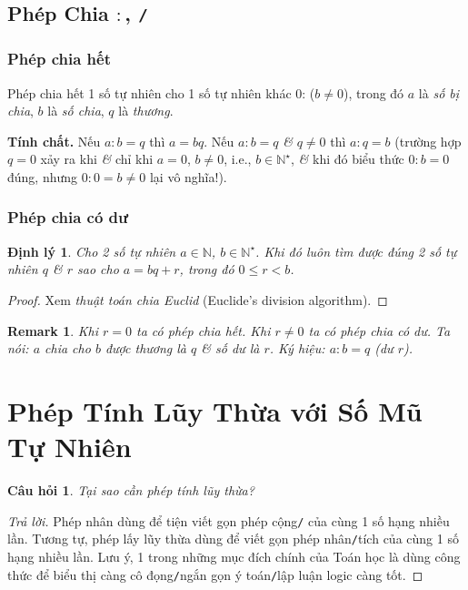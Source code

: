 \documentclass[oneside]{book}
\numberwithin{equation}{section}
\newtheorem{cauhoi}{Câu hỏi}[section]
\newtheorem{remark}{Remark}[section]
\newtheorem{dinhly}{Định lý}[section]
\begin{document}
\subsection{Phép Chia $:$, \texttt{/}}

\subsubsection{Phép chia hết}
Phép chia hết 1 số tự nhiên cho 1 số tự nhiên khác 0:  ($b\ne 0$), trong đó $a$ là \textit{số bị chia}, $b$ là \textit{số chia}, $q$ là \textit{thương}.

\noindent\textbf{Tính chất.} Nếu $a:b = q$ thì $a = bq$. Nếu $a:b = q$ \textit{\&} $q\ne 0$ thì $a:q = b$ (trường hợp $q = 0$ xảy ra khi \textit{\&} chỉ khi $a = 0$, $b\ne 0$, i.e., $b\in\mathbb{N}^\star$, \textit{\&} khi đó biểu thức $0:b = 0$ đúng, nhưng $0:0 = b\ne 0$ lại vô nghĩa!).

\subsubsection{Phép chia có dư}
\begin{dinhly}
	Cho 2 số tự nhiên $a\in\mathbb{N}$, $b\in\mathbb{N}^\star$. Khi đó luôn tìm được đúng 2 số tự nhiên $q$ \textit{\&} $r$ sao cho $a = bq + r$, trong đó $0\le r < b$.
\end{dinhly}

\begin{proof}[Proof]
	Xem \textit{thuật toán chia Euclid} (Euclide's division algorithm).
\end{proof}

\begin{remark}
	Khi $r = 0$ ta có phép chia hết. Khi $r\ne 0$ ta có phép chia có dư. Ta nói: $a$ chia cho $b$ được thương là $q$ \textit{\&} số dư là $r$. Ký hiệu: $a:b = q$ (dư $r$).
\end{remark}


\section{Phép Tính Lũy Thừa với Số Mũ Tự Nhiên}

\begin{cauhoi}
	Tại sao cần phép tính lũy thừa?
\end{cauhoi}

\begin{proof}[Trả lời]
	Phép nhân dùng để tiện viết gọn phép cộng\texttt{/} của cùng 1 số hạng nhiều lần. Tương tự, phép lấy lũy thừa dùng để viết gọn phép nhân\texttt{/}tích của cùng 1 số hạng nhiều lần. Lưu ý, 1 trong những mục đích chính của Toán học là dùng công thức để biểu thị càng cô đọng\texttt{/}ngắn gọn ý toán\texttt{/}lập luận logic càng tốt.
\end{proof}
\end{document}
